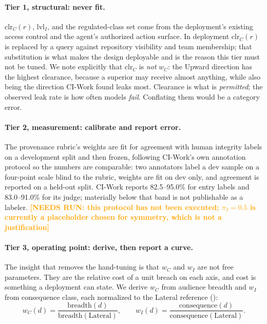 \documentclass[conference,compsoc]{IEEEtran}
\newcommand{\needsrun}[1]{\textcolor{orange}{\textbf{[NEEDS RUN: #1]}}}
\newcommand{\clr}{\ensuremath{\mathrm{clr}_C}}   %
\newcommand{\lvlI}{\ensuremath{\mathrm{lvl}_I}}  %
\newcommand{\wC}{\ensuremath{w_C}}
\newcommand{\wI}{\ensuremath{w_I}}
\begin{document}
\paragraph{Tier 1, structural: never fit.} $\clr(r)$, $\lvlI$, and the
regulated-class set come from the deployment's existing access control and the
agent's authorized action surface. In deployment $\clr(r)$ is replaced by a
query against repository visibility and team membership; that substitution is
what makes the design deployable and is the reason this tier must not be
tuned. We note explicitly that $\clr$ is \emph{not} $\wC$: the Upward
direction has the highest clearance, because a superior may receive almost
anything, while also being the direction CI-Work found leaks most. Clearance is
what is \emph{permitted}; the observed leak rate is how often models
\emph{fail}. Conflating them would be a category error.

\paragraph{Tier 2, measurement: calibrate and report error.} The provenance
rubric's weights are fit for agreement with human integrity labels on a
development split and then frozen, following CI-Work's own annotation protocol
so the numbers are comparable: two annotators label a dev sample on a four-point
scale blind to the rubric, weights are fit on dev only, and agreement is
reported on a held-out split. CI-Work reports 82.5--95.0\% for entry labels and
83.0--91.0\% for its judge; materially below that band is not publishable as a
labeler. \needsrun{this protocol has not been executed; $\pi_I = 0.5$ is
currently a placeholder chosen for symmetry, which is not a justification}

\paragraph{Tier 3, operating point: derive, then report a curve.} The insight
that removes the hand-tuning is that $\wC$ and $\wI$ are not free parameters.
They are the relative cost of a unit breach on each axis, and cost is something
a deployment can state. We derive $\wC$ from audience breadth and $\wI$ from
consequence class, each normalized to the Lateral reference
():
\begin{equation}
\wC(d) = \frac{\mathrm{breadth}(d)}{\mathrm{breadth}(\text{Lateral})},
\qquad
\wI(d) = \frac{\mathrm{consequence}(d)}{\mathrm{consequence}(\text{Lateral})}.
\end{equation}
\end{document}
